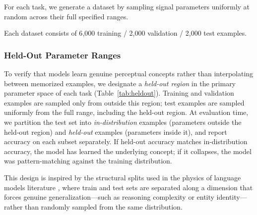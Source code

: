 \documentclass[11pt]{article}
\begin{document}
For each task, we generate a dataset by sampling signal parameters uniformly at random across their full specified ranges.

Each dataset consists of 6{,}000 training / 2{,}000 validation / 2{,}000 test examples.

\subsubsection{Held-Out Parameter Ranges}
\label{sec:heldout}

To verify that models learn genuine perceptual concepts rather than interpolating between memorized examples, we designate a \emph{held-out region} in the primary parameter space of each task (Table~\ref{tab:heldout}). Training and validation examples are sampled only from outside this region; test examples are sampled uniformly from the full range, including the held-out region. At evaluation time, we partition the test set into \emph{in-distribution} examples (parameters outside the held-out region) and \emph{held-out} examples (parameters inside it), and report accuracy on each subset separately. If held-out accuracy matches in-distribution accuracy, the model has learned the underlying concept; if it collapses, the model was pattern-matching against the training distribution.

This design is inspired by the structural splits used in the physics of language models literature \citep{allenzhu2023physics}, where train and test sets are separated along a dimension that forces genuine generalization---such as reasoning complexity or entity identity---rather than randomly sampled from the same distribution.
\end{document}
